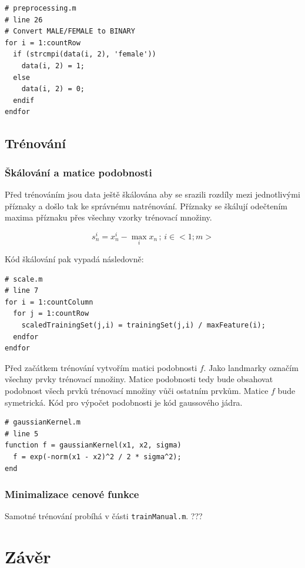 \documentclass[a4]{article}
\begin{document}
\begin{lstlisting}
# preprocessing.m
# line 26 
# Convert MALE/FEMALE to BINARY
for i = 1:countRow
  if (strcmpi(data(i, 2), 'female'))
    data(i, 2) = 1;
  else
    data(i, 2) = 0;
  endif
endfor
\end{lstlisting}

\subsection{Trénování}
\subsubsection{Škálování a matice podobnosti}
Před trénováním jsou data ještě škálována aby se srazili rozdíly mezi jednotlivými příznaky a došlo tak ke správnému natrénování. Příznaky se škálují odečtením maxima příznaku přes všechny vzorky trénovací množiny.

$$
s_{n}^{i} = x_{n}^{i} - \max_{i} x_{n} \,;\, i \in <1;m>
$$

\noindent Kód škálování pak vypadá následovně:

\begin{lstlisting}
# scale.m
# line 7 
for i = 1:countColumn
  for j = 1:countRow
    scaledTrainingSet(j,i) = trainingSet(j,i) / maxFeature(i);
  endfor
endfor 
\end{lstlisting}

\noindent Před začátkem trénování vytvořím matici podobnosti $f$. Jako landmarky označím všechny prvky trénovací množiny. Matice podobnosti tedy bude obsahovat podobnost všech prvků trénovací množiny vůči ostatním prvkům. Matice $f$ bude symetrická. Kód pro výpočet podobnosti je kód gaussového jádra.

\begin{lstlisting}
# gaussianKernel.m
# line 5
function f = gaussianKernel(x1, x2, sigma)
  f = exp(-norm(x1 - x2)^2 / 2 * sigma^2); 
end
\end{lstlisting}

\subsubsection{Minimalizace cenové funkce}
Samotné trénování probíhá v části \texttt{trainManual.m}.
???

\newpage

\section{Závěr}
\end{document}
